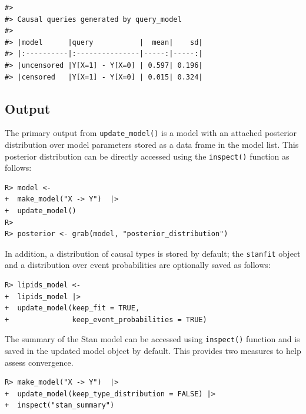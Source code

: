\documentclass[
  11pt,
  article]{jss}
\begin{document}
\begin{verbatim}
#> 
#> Causal queries generated by query_model
#> 
#> |model      |query           |  mean|    sd|
#> |:----------|:---------------|-----:|-----:|
#> |uncensored |Y[X=1] - Y[X=0] | 0.597| 0.196|
#> |censored   |Y[X=1] - Y[X=0] | 0.015| 0.324|
\end{verbatim}

\subsection{Output}\label{output}

The primary output from \texttt{update\_model()} is a model with an
attached posterior distribution over model parameters stored as a data
frame in the model list. This posterior distribution can be directly
accessed using the \texttt{inspect()} function as follows:

\begin{verbatim}
R> model <-
+  make_model("X -> Y")  |> 
+  update_model()
R> 
R> posterior <- grab(model, "posterior_distribution")  
\end{verbatim}

In addition, a distribution of causal types is stored by default; the
\texttt{stanfit} object and a distribution over event probabilities are
optionally saved as follows:

\begin{verbatim}
R> lipids_model <- 
+  lipids_model |> 
+  update_model(keep_fit = TRUE,
+               keep_event_probabilities = TRUE)
\end{verbatim}

The summary of the Stan model can be accessed using \texttt{inspect()}
function and is saved in the updated model object by default. This
provides two measures to help assess convergence.

\begin{verbatim}
R> make_model("X -> Y")  |> 
+  update_model(keep_type_distribution = FALSE) |>
+  inspect("stan_summary") 
\end{verbatim}
\end{document}
